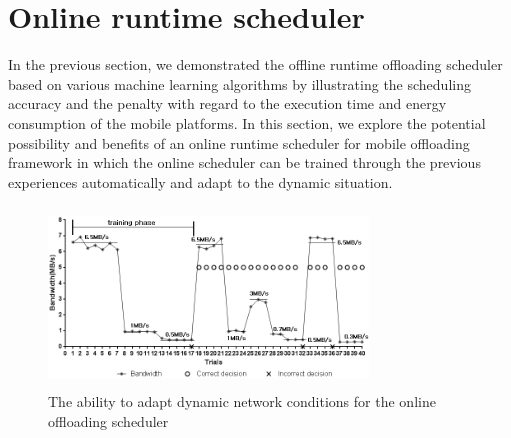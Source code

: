\documentclass[10pt, conference, compsocconf]{IEEEtran}
\begin{document}
\section{Online runtime scheduler}
In the previous section, we demonstrated the offline runtime offloading
scheduler based on various machine learning algorithms by illustrating
the scheduling accuracy and the penalty with regard to the execution
time and energy consumption of the mobile platforms.
%
In this section, we explore the potential possibility and benefits of an
online runtime scheduler for mobile offloading framework in which
the online scheduler can be trained through the previous experiences
automatically and adapt to the dynamic situation.
%
%
\begin{figure}
\centering
\includegraphics[height=4.8cm, width=8.5cm]{Figure/figure7}
\caption{The ability to adapt dynamic network conditions for the online
offloading scheduler}
\end{figure}
%
\end{document}
